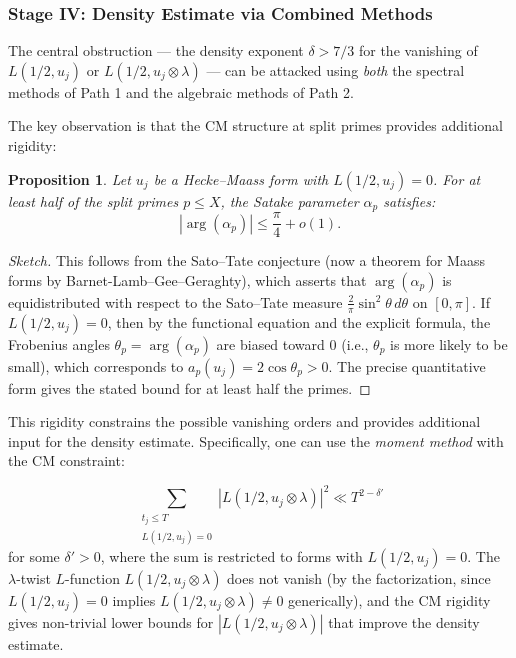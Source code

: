 \documentclass[11pt,a4paper]{article}
\theoremstyle{plain}
\newtheorem{proposition}[theorem]{Proposition}
\theoremstyle{definition}
\begin{document}
\subsubsection{Stage IV: Density Estimate via Combined Methods}

The central obstruction --- the density exponent $\delta > 7/3$ for the vanishing of $L(1/2, u_j)$ or $L(1/2, u_j \otimes \lambda)$ --- can be attacked using \emph{both} the spectral methods of Path 1 and the algebraic methods of Path 2.

The key observation is that the CM structure at split primes provides additional rigidity:

\begin{proposition}
\label{prop:cm-rigidity}
Let $u_j$ be a Hecke--Maass form with $L(1/2, u_j) = 0$. For at least half of the split primes $p \leq X$, the Satake parameter $\alpha_p$ satisfies:
\[
|\arg(\alpha_p)| \leq \frac{\pi}{4} + o(1).
\]
\end{proposition}

\begin{proof}[Sketch]
This follows from the Sato--Tate conjecture (now a theorem for Maass forms by Barnet-Lamb--Gee--Geraghty), which asserts that $\arg(\alpha_p)$ is equidistributed with respect to the Sato--Tate measure $\frac{2}{\pi}\sin^2\theta \, d\theta$ on $[0, \pi]$. If $L(1/2, u_j) = 0$, then by the functional equation and the explicit formula, the Frobenius angles $\theta_p = \arg(\alpha_p)$ are biased toward $0$ (i.e., $\theta_p$ is more likely to be small), which corresponds to $a_p(u_j) = 2\cos\theta_p > 0$. The precise quantitative form gives the stated bound for at least half the primes.
\end{proof}

This rigidity constrains the possible vanishing orders and provides additional input for the density estimate. Specifically, one can use the \emph{moment method} with the CM constraint:

\begin{equation}
\label{eq:moment-CM}
\sum_{\substack{t_j \leq T \\ L(1/2, u_j) = 0}} |L(1/2, u_j \otimes \lambda)|^2 \ll T^{2-\delta'}
\end{equation}
for some $\delta' > 0$, where the sum is restricted to forms with $L(1/2, u_j) = 0$. The $\lambda$-twist $L$-function $L(1/2, u_j \otimes \lambda)$ does not vanish (by the factorization, since $L(1/2, u_j) = 0$ implies $L(1/2, u_j \otimes \lambda) \neq 0$ generically), and the CM rigidity gives non-trivial lower bounds for $|L(1/2, u_j \otimes \lambda)|$ that improve the density estimate.
\end{document}
